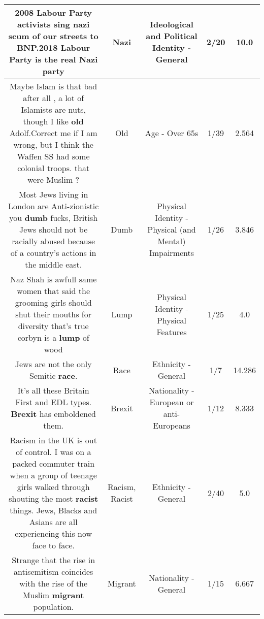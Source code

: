 \documentclass[11pt]{article}
\newlength\mylength
\begin{document}
\begin{center}
\begin{longtable}{|C{.65\mylength}|C{.30\mylength}|C{.12\mylength}|C{.12\mylength}|C{.12\mylength}|}
  \small 2008 Labour Party activists sing \textbf{nazi} scum of our streets to BNP.2018 Labour Party is the real \textbf{Nazi} party\normalsize   & Nazi &  Ideological and Political Identity - General & 2/20 & 10.0 \\  \hline
  \small Maybe  Islam is that  bad after all , a lot of Islamists are nuts,  though  I like \textbf{old} Adolf.Correct me if I am  wrong, but I think the Waffen  SS  had  some colonial  troops. that  were  Muslim  ?\normalsize   & Old & Age - Over 65s & 1/39 & 2.564 \\  \hline
  \small Most Jews living in London are Anti-zionistic you \textbf{dumb} fucks,  British Jews should not be racially abused because of a country's actions in the middle east.\normalsize   & Dumb & Physical Identity - Physical (and Mental) Impairments & 1/26 & 3.846 \\  \hline
  \small Naz Shah is awfull same women that said the grooming girls should shut their mouths for diversity that's true corbyn is a \textbf{lump} of wood\normalsize   & Lump & Physical Identity - Physical Features & 1/25 & 4.0 \\  \hline
  \small Jews are not the only Semitic \textbf{race}.\normalsize   & Race & Ethnicity - General & 1/7 & 14.286 \\  \hline
  \small It's all these Britain First and EDL types. \textbf{Brexit} has emboldened them.\normalsize   & Brexit & Nationality - European or anti-Europeans & 1/12 & 8.333 \\  \hline
  \small Racism in the UK is out of control. I was on a packed commuter train when a group of teenage girls walked through shouting the most \textbf{racist} things.  Jews, Blacks and Asians are all experiencing this now face to face.\normalsize   & Racism, Racist & Ethnicity - General & 2/40 & 5.0 \\  \hline
  \small Strange that the rise in antisemitism coincides with the rise of the Muslim \textbf{migrant} population.\normalsize   & Migrant & Nationality - General & 1/15 & 6.667 \\  \hline

\end{longtable}
\end{center}
\end{document}
